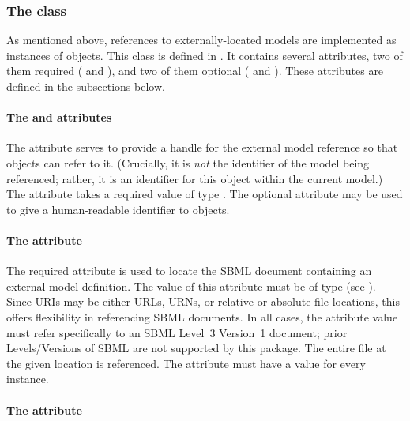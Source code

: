 \subsubsection{The  class}
\label{externalmodeldefinition-class}

As mentioned above, references to externally-located models are
implemented as instances of \ExternalModelDefinition objects.  This
class is defined in .  It contains several
attributes, two of them required ( and ), and
two of them optional ( and ).  These
attributes are defined in the subsections below.


\paragraph{The \hspace*{1pt} and  attributes}

The  attribute serves to provide a handle for the external
model reference so that \Submodel objects can refer to it.  (Crucially,
it is \emph{not} the identifier of the model being referenced; rather,
it is an identifier for this \ExternalModelDefinition object within the
current model.)  The  attribute takes a required value of type
.  The optional attribute  may be used to give a human-readable identifier to \ExternalModelDefinition objects.  


\paragraph{The \hspace*{1pt} attribute}

The required attribute  is used to locate the SBML
document containing an external model definition.  The value of this
attribute must be of type  (see ).
Since URIs may be either URLs, URNs, or relative or absolute file
locations, this offers flexibility in referencing SBML documents.  In
all cases, the  attribute value must refer specifically to
an SBML Level~3 Version~1 document; prior Levels/Versions of SBML are
not supported by this package.  The entire file at the given location is
referenced.  The  attribute must have a value for every
\ExternalModelDefinition instance.


\paragraph{The \hspace*{1pt} attribute}

